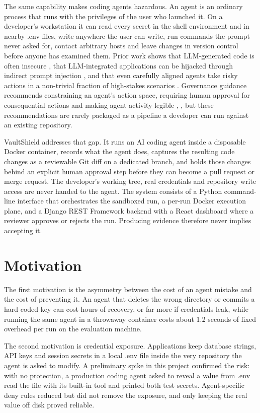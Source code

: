 \documentclass[12pt,a4paper,oneside]{report}
\begin{document}
The same capability makes coding agents hazardous. An agent is an ordinary process that runs with the privileges of the user who launched it. On a developer's workstation it can read every secret in the shell environment and in nearby .env files, write anywhere the user can write, run commands the prompt never asked for, contact arbitrary hosts and leave changes in version control before anyone has examined them. Prior work shows that LLM-generated code is often insecure \cite{ref8}, that LLM-integrated applications can be hijacked through indirect prompt injection \cite{ref7}, and that even carefully aligned agents take risky actions in a non-trivial fraction of high-stakes scenarios \cite{ref5}. Governance guidance recommends constraining an agent's action space, requiring human approval for consequential actions and making agent activity legible \cite{ref9}, \cite{ref10}, but these recommendations are rarely packaged as a pipeline a developer can run against an existing repository.

VaultShield addresses that gap. It runs an AI coding agent inside a disposable Docker container, records what the agent does, captures the resulting code changes as a reviewable Git diff on a dedicated branch, and holds those changes behind an explicit human approval step before they can become a pull request or merge request. The developer's working tree, real credentials and repository write access are never handed to the agent. The system consists of a Python command-line interface that orchestrates the sandboxed run, a per-run Docker execution plane, and a Django REST Framework backend with a React dashboard where a reviewer approves or rejects the run. Producing evidence therefore never implies accepting it.

\section{Motivation}\label{motivation}

The first motivation is the asymmetry between the cost of an agent mistake and the cost of preventing it. An agent that deletes the wrong directory or commits a hard-coded key can cost hours of recovery, or far more if credentials leak, while running the same agent in a throwaway container costs about 1.2 seconds of fixed overhead per run on the evaluation machine.

The second motivation is credential exposure. Applications keep database strings, API keys and session secrets in a local .env file inside the very repository the agent is asked to modify. A preliminary spike in this project confirmed the risk: with no protection, a production coding agent asked to reveal a value from .env read the file with its built-in tool and printed both test secrets. Agent-specific deny rules reduced but did not remove the exposure, and only keeping the real value off disk proved reliable.
\end{document}
